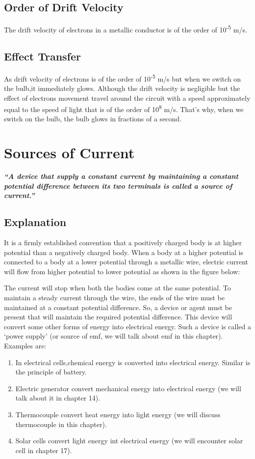 \subsection*{Order of Drift Velocity}
The drift velocity of electrons in a metallic conductor is of the order of 10\textsuperscript{-5} m/s.
\subsection*{Effect Transfer}
As drift velocity of electrons is of the order of 10\textsuperscript{-5} m/s but when we switch on the bulb,it immediately glows. Although the drift velocity is negligible but the effect of electrons movement travel around the circuit with a speed approximately equal to the speed of light that is of the order of 10\textsuperscript{8} m/s. That’s why, when we switch on the bulb, the bulb glows in fractions of a second.
\section{Sources of Current}
\textit{\textbf{``A device that supply a constant current by maintaining a constant potential difference between its two terminals is called a source of current.”}}
\subsection*{Explanation}
It is a firmly established convention that a positively charged body is at higher potential than a negatively charged body. When a body at a higher potential is connected to a body at a lower potential through a metallic wire, electric current will flow from higher potential to lower potential as shown in the figure below:


The current will stop when both the bodies come at the same potential. To maintain a steady current through the wire, the ends of the wire must be maintained at a constant potential difference. So, a device or agent must be present that will maintain the required potential difference. This device will convert some other forms of energy into electrical energy. Such a device is called a ‘power supply’ (or source of emf, we will talk about emf in this chapter). Examples are:
\begin{enumerate}[label=(\roman*)] 
    \item In electrical cells,chemical energy is converted into electrical energy.
    Similar is the principle of battery.
    \item Electric generator convert mechanical energy
    into electrical energy (we will talk about it in chapter 14).
    \item Thermocouple convert heat energy into light energy
    (we will discuss thermocouple in this chapter).
    \item Solar cells convert light energy int electrical
    energy (we will encounter solar cell in chapter 17).
\end{enumerate}

